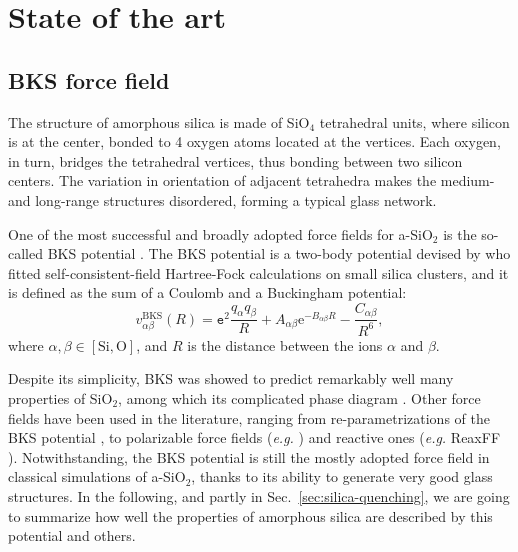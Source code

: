\section{State of the art}  \label{sec:silica-state-of-the-art}

\subsection{BKS force field}  \label{sec:silica-force-field}
The structure of amorphous silica is made of SiO$_4$ tetrahedral units, where silicon is at the center, bonded to 4 oxygen atoms located at the vertices. Each oxygen, in turn, bridges the tetrahedral vertices, thus bonding between two silicon centers. The variation in orientation of adjacent tetrahedra makes the medium- and long-range structures disordered, forming a typical glass network.

One of the most successful and broadly adopted force fields for a-SiO$_2$ is the so-called BKS potential \cite{Silica-BKS-1990}. 
The BKS potential is a two-body potential devised by \citeauthor*{Silica-BKS-1990} who fitted self-consistent-field Hartree-Fock calculations on small silica clusters, and it is defined as the sum of a Coulomb and a Buckingham potential:
\begin{equation}
    v_{\alpha\beta}^{\mathrm{BKS}}(R) = \mathtt{e}^2 \frac{q_\alpha q_\beta}{R} + A_{\alpha\beta}\mathrm{e}^{-B_{\alpha\beta}R} - \frac{C_{\alpha\beta}}{R^6}, \label{eq:BKS}
\end{equation}
where $\alpha,\beta \in [\text{Si},\text{O}]$, and $R$ is the distance between the ions $\alpha$ and $\beta$. 

Despite its simplicity, BKS was showed to predict remarkably well many properties of SiO$_2$, among which its complicated phase diagram \cite{Saika2004}. 
Other force fields have been used in the literature, ranging from re-parametrizations of the BKS potential \cite{Carre2008}, to polarizable force fields (\emph{e.g.} \citet{Tangney2002}) and reactive ones (\emph{e.g.} ReaxFF \cite{Yuan2001}). 
Notwithstanding, the BKS potential is still the mostly adopted force field in classical simulations of a-SiO$_2$, thanks to its ability to generate very good glass structures. 
In the following, and partly in Sec.~\ref{sec:silica-quenching}, we are going to summarize how well the properties of amorphous silica are described by this potential and others.


